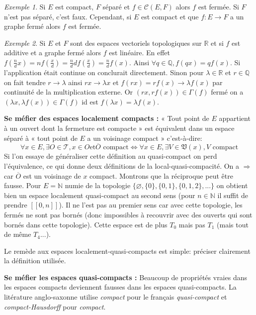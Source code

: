 \documentclass[a4paper, 11pt, french]{book}
\theoremstyle{plain} %
\theoremstyle{definition} %
\theoremstyle{remark} %
\newtheorem{exemple}{Exemple}
\newcommand{\1}{\mathds{1}}
\newcommand\vide{\varnothing}
\newcommand{\et}{\mathrel{\mathrm{et}}}
\newcommand{\N}{\mathbb{N}}
\newcommand{\Q}{\mathbb{Q}}
\newcommand{\R}{\mathbb{R}}
\renewcommand{\cal}[1]{\mathcal{#1}}
\renewcommand{\frak}[1]{\mathfrak{#1}}
\newcommand{\scr}[1]{\mathscr{#1}}
\newcommand\intervalle[1]{[\![#1]\!]}
\begin{document}
\begin{exemple}
	Si $E$ est compact, $F$ séparé et $f\in\cal{C}(E, F)$ alors $f$ est fermée.
	Si $F$ n'est pas séparé, c'est faux.
	Cependant, si $E$ est compact et que $f:E\rightarrow F$ a un graphe fermé alors $f$ est fermée.
\end{exemple}

\begin{exemple}
	Si $E$ et $F$ sont des espaces vectoriels topologiques sur $\R$ et si $f$ est additive et a graphe fermé alors $f$ est linéaire.
	En effet $f(\frac{n}{d}x)=nf(\frac{x}{d})=\frac{n}{d}df(\frac{x}{d})=\frac{n}{d}f(x)$.
	Ainsi $\forall q\in\Q, f(qx)=qf(x)$.
	Si l'application était continue on conclurait directement.
	Sinon pour $\lambda\in\R$ et $r\in\Q$ on fait tendre $r\rightarrow\lambda$ ainsi $rx\rightarrow\lambda x$ et $f(rx)=rf(x)\rightarrow\lambda f(x)$ par continuité de la multiplication externe.
	Or $(rx, rf(x))\in\Gamma(f)$ fermé on a $(\lambda x, \lambda f(x))\in\Gamma(f)$ id est $f(\lambda x)=\lambda f(x)$.
\end{exemple}

\textbf{Se méfier des espaces localement compacts :}
« Tout point de $E$ appartient à un ouvert dont la fermeture est compacte » est équivalent dans un espace séparé à « tout point de $E$ a un voisinage compact » c'est-à-dire:
$$
	\forall x\in E, \exists O\in\scr{T}, x\in O\et\overline{O}\text{ compact}
	\iff
	\forall x\in E, \exists V\in\frak{V}(x), V\text{ compact}
$$
Si l'on essaye de généraliser cette définition au quasi-compact on perd l'équivalence, ce qui donne deux définitions de la local-quasi-compacité.
On a $\Rightarrow$ car $\overline{O}$ est un voisinage de $x$ compact.
Montrons que la réciproque peut être fausse.
Pour $E=\N$ numie de la topologie $\{\vide, \{0\}, \{0, 1\}, \{0, 1, 2\}, ...\}$ on obtient bien un espace localement quasi-compact au second sens (pour $n\in\N$ il suffit de prendre $\intervalle{0, n}$).
Il ne l'est pas au premier sens car avec cette topologie, les fermés ne sont pas bornés (donc impossibles à recouvrir avec des ouverts qui sont bornés dans cette topologie).
Cette espace est de plus $T_0$ mais pas $T_1$ (mais tout de même $T_4$...).

Le remède aux espaces localement-quasi-compacts est simple: préciser clairement la définition utilisée.

\textbf{Se méfier les espaces quasi-compacts :}
Beaucoup de propriétés vraies dans les espaces compacts deviennent fausses dans les espaces quasi-compacts.
La litérature anglo-saxonne utilise \textit{compact} pour le français \textit{quasi-compact} et \textit{compact-Hausdorff} pour \textit{compact}.
\end{document}
